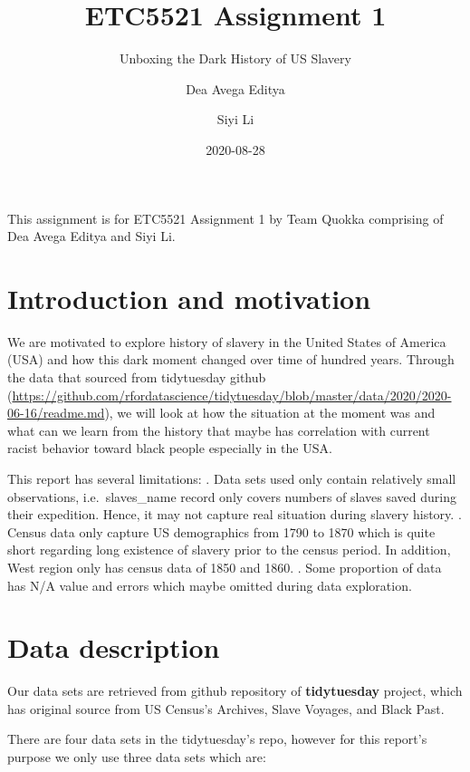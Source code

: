 \documentclass[
]{article}
\title{ETC5521 Assignment 1}
\subtitle{Unboxing the Dark History of US Slavery}
\author{Dea Avega Editya \and Siyi Li}
\date{2020-08-28}
\begin{document}
\maketitle

{
\setcounter{tocdepth}{2}
\tableofcontents
}
{This assignment is for ETC5521 Assignment 1 by Team Quokka comprising of Dea Avega Editya and Siyi Li.}

\hypertarget{introduction-and-motivation}{%
\section{Introduction and motivation}\label{introduction-and-motivation}}

We are motivated to explore history of slavery in the United States of America (USA) and how this dark moment changed over time of hundred years. Through the data that sourced from tidytuesday github (\url{https://github.com/rfordatascience/tidytuesday/blob/master/data/2020/2020-06-16/readme.md}), we will look at how the situation at the moment was and what can we learn from the history that maybe has correlation with current racist behavior toward black people especially in the USA.

This report has several limitations:
. Data sets used only contain relatively small observations, i.e.~slaves\_name record only covers numbers of slaves saved during their expedition. Hence, it may not capture real situation during slavery history.
. Census data only capture US demographics from 1790 to 1870 which is quite short regarding long existence of slavery prior to the census period. In addition, West region only has census data of 1850 and 1860.
. Some proportion of data has N/A value and errors which maybe omitted during data exploration.

\hypertarget{data-description}{%
\section{Data description}\label{data-description}}

Our data sets are retrieved from github repository of \textbf{tidytuesday} project, which has original source from US Census's Archives, Slave Voyages, and Black Past.

There are four data sets in the tidytuesday's repo, however for this report's purpose we only use three data sets which are:
\end{document}
